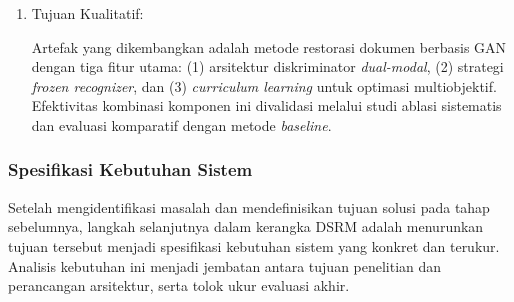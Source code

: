 \documentclass[12pt,a4paper]{article}
\begin{document}
\begin{enumerate}[label=\arabic*., leftmargin=*, labelindent=0pt, itemsep=1ex, topsep=0pt]
\item Tujuan Kualitatif:

Artefak yang dikembangkan adalah metode restorasi dokumen berbasis GAN dengan tiga fitur utama: (1) arsitektur diskriminator \textit{dual-modal}, (2) strategi \textit{frozen recognizer}, dan (3) \textit{curriculum learning} untuk optimasi multiobjektif. Efektivitas kombinasi komponen ini divalidasi melalui studi ablasi sistematis dan evaluasi komparatif dengan metode \textit{baseline}.
\end{enumerate}

\subsubsection{Spesifikasi Kebutuhan Sistem}
\label{subsubsec:requirements-analysis}

Setelah mengidentifikasi masalah dan mendefinisikan tujuan solusi pada tahap sebelumnya, langkah selanjutnya dalam kerangka DSRM adalah menurunkan tujuan tersebut menjadi spesifikasi kebutuhan sistem yang konkret dan terukur. Analisis kebutuhan ini menjadi jembatan antara tujuan penelitian dan perancangan arsitektur, serta tolok ukur evaluasi akhir.
\end{document}
